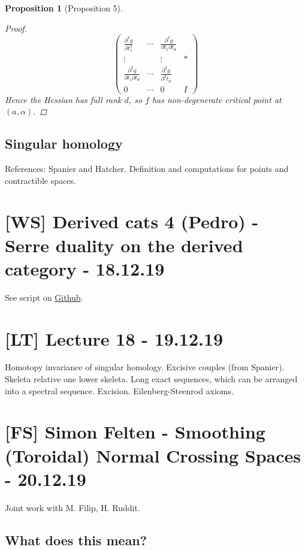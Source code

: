 \documentclass[A4paper, british]{amsart}
\theoremstyle{darkgreentheorem}
\newtheorem{prop}[thm]{Proposition}
\theoremstyle{darkbluedefinition}
\theoremstyle{darkredexample}
\theoremstyle{remark}
\newcommand{\1}{\mathbbm{1}}
\begin{document}
\begin{prop}[Proposition 5]
\begin{proof}
	\[ \begin{pmatrix} \frac{\partial^{2} g}{\partial t_{1}^{2}} & \cdots & \frac{\partial^{2}g}{\partial t_{1}\partial t_{d}} & \\
	    \vdots & & \vdots & * \\
	    \frac{\partial^{2}g}{\partial t_{1}\partial t_{d}} & \cdots & \frac{\partial^{2} g}{\partial^{2}t_{d}} & \\
	    0 & \cdots & 0 & I
	\end{pmatrix} \]
	Hence the Hessian has full rank $d$, so $f$ has non-degenerate critical point at $(a,\alpha)$.
    \end{proof}
\end{prop}

\subsection{Singular homology}

References: Spanier and Hatcher.
Definition and computations for points and contractible spaces.

\section{[WS] Derived cats 4 (Pedro) - Serre duality on the derived category - 18.12.19}

See script on \href{https://github.com/pedro-nlb/sd}{Github}.

\section{[LT] Lecture 18 - 19.12.19}

Homotopy invariance of singular homology.
Excisive couples (from Spanier).
Skeleta relative one lower skeleta.
Long exact sequences, which can be arranged into a spectral sequence.
Excision.
Eilenberg-Steenrod axioms.

\section{[FS] Simon Felten - Smoothing (Toroidal) Normal Crossing Spaces - 20.12.19}

Joint work with M. Filip, H. Ruddit.

\subsection{What does this mean?}
\end{document}
